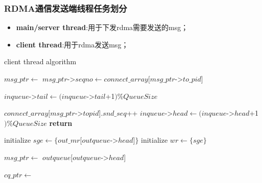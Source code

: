 {\newpage
\subsubsection{RDMA通信发送端线程任务划分}

\begin{itemize}[leftmargin=*, nosep]
    \item \textbf{main/server thread}:用于下发rdma需要发送的msg；
    \item \textbf{client thread}:用于rdma发送msg；
\end{itemize}

\begin{algorithm}
    \caption{client thread algorithm}
    \begin{algorithmic}[1] %
                \State {}
                \State $msg\_ptr \gets$ 
                \State $msg\_ptr$->$seqno \gets connect\_array[msg\_ptr$->$to\_pid]$

                \State
                    \State {} 
                    \State {} 
                    \State {}
                    \State $inqueue$->$tail \gets (inqueue$->$tail$+1$) \%QueueSize$
                \Else
                    \EndWhile
                \EndIf
                
                \State
                \State $connect\_array[msg\_ptr$->$topid].snd\_seq$++
                \State $inqueue$->$head \gets (inqueue$->$head$+1$) \% QueueSize$
                \State {}
            \EndWhile
            \State \textbf{return}
         \EndProcedure

            \State initialize $sge \gets \{out\_mr[outqueue$->$head] \}$
            \State initialize $wr \gets \{sge\}$ 

            \State
            \State $msg\_ptr \gets$ $outqueue[outqueue$->$head]$

            \EndWhile

            \State
            \State $cq\_ptr \gets$ 
            \State {}


\end{algorithmic}
\end{algorithm}}
